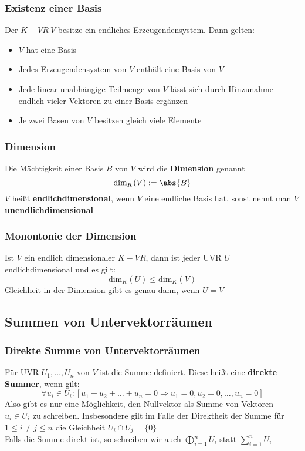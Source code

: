 \documentclass{kit}
\begin{document}
    \subsubsection{Existenz einer Basis}
      Der $K-VR\ V$ besitze ein endliches Erzeugendensystem. Dann gelten:
      \begin{itemize}
        \item $V$ hat eine Basis
        \item Jedes Erzeugendensystem von $V$ enthält eine Basis von $V$
        \item Jede linear unabhängige Teilmenge von $V$ lässt sich durch Hinzunahme endlich vieler Vektoren zu einer Basis ergänzen
        \item Je zwei Basen von $V$ besitzen gleich viele Elemente
       \end{itemize}
    \subsubsection{Dimension}
       Die Mächtigkeit einer Basis $B$ von $V$ wird die \textbf{Dimension} genannt
       $$\text{dim}_K(V):=\abs{B}$$
       $V$ heißt \textbf{endlichdimensional}, wenn $V$ eine endliche Basis hat, sonst nennt man $V$ \textbf{unendlichdimensional}
    \subsubsection{Monontonie der Dimension}
       Ist $V$ ein endlich dimensionaler $K-VR$, dann ist jeder UVR $U$ endlichdimensional und es gilt:
       $$\text{dim}_K(U)\le\text{dim}_K(V)$$
       Gleichheit in der Dimension gibt es genau dann, wenn $U=V$
  \subsection{Summen von Untervektorräumen}
    \subsubsection{Direkte Summe von Untervektorräumen}
      Für UVR $U_1,\dots,U_n$ von $V$ ist die Summe definiert. Diese heißt eine \textbf{direkte Summer}, wenn gilt:
      $$\forall u_i\in U_i:[u_1+u_2+\dots+u_n=0\Longrightarrow u_1=0,u_2=0,\dots,u_n=0]$$
      Also gibt es nur eine Möglichkeit, den Nullvektor als Summe von Vektoren $u_i\in U_i$ zu schreiben. Insbesondere gilt im Falle der Direktheit der Summe für $1\le i\neq j\le n$ die Gleichheit $U_i\cap U_j=\{0\}$\\
      Falls die Summe direkt ist, so schreiben wir auch $\bigoplus_{i=1}^nU_i$ statt $\sum_{i=1}^nU_i$
\end{document}
